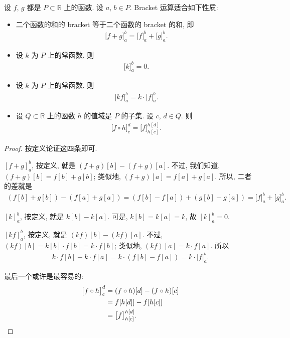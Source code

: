 \begin{theorem}
    设 $f$, $g$ 都是 $P \subset \mathbb{R}$ 上的函数. 设 $a$, $b \in P$. Bracket 运算适合如下性质:
    \begin{itemize}
        \item 二个函数的和的 bracket 等于二个函数的 bracket 的和, 即
              \begin{align*}
                  \big[ f + g \big]_{a}^{b} = \big[ f \big]_{a}^{b} + \big[ g \big]_{a}^{b}.
              \end{align*}
        \item 设 $k$ 为 $P$ 上的常函数. 则
              \begin{align*}
                  \big[ k \big]_{a}^{b} = 0.
              \end{align*}
        \item 设 $k$ 为 $P$ 上的常函数. 则
              \begin{align*}
                  \big[ kf \big]_{a}^{b} = k \cdot \big[ f \big]_{a}^{b}.
              \end{align*}
        \item 设 $Q \subset \mathbb{R}$ 上的函数 $h$ 的值域是 $P$ 的子集. 设 $c$, $d \in Q$. 则
              \begin{align*}
                  \big[ f \circ h \big]_{c}^{d} = \big[ f \big]_{h[c]}^{h[d]}.
              \end{align*}
    \end{itemize}
\end{theorem}

\begin{proof}
    按定义论证这四条即可.

    $[ f + g ]_{a}^{b}$, 按定义, 就是 $(f + g)[b] - (f + g)[a]$. 不过, 我们知道, $(f + g)[b] = f[b] + g[b]$; 类似地, $(f + g)[a] = f[a] + g[a]$. 所以, 二者的差就是
    \begin{align*}
        (f[b] + g[b]) - (f[a] + g[a])
        = (f[b] - f[a]) + (g[b] - g[a])
        = \big[ f \big]_{a}^{b} + \big[ g \big]_{a}^{b}.
    \end{align*}

    $[ k ]_{a}^{b}$, 按定义, 就是 $k[b] - k[a]$. 可是, $k[b] = k[a] = k$, 故 $[ k ]_{a}^{b} = 0$.

    $[ kf ]_{a}^{b}$, 按定义, 就是 $(kf)[b] - (kf)[a]$. 不过, $(kf)[b] = k[b] \cdot f[b] = k \cdot f[b]$; 类似地, $(kf)[a] = k \cdot f[a]$. 所以
    \begin{align*}
        k \cdot f[b] - k \cdot f[a] = k \cdot (f[b] - f[a]) = k \cdot \big[ f \big]_{a}^{b}.
    \end{align*}

    最后一个或许是最容易的:
    \begin{align*}
        \big[ f \circ h \big]_{c}^{d}
        = {} & (f \circ h)[d] - (f \circ h)[c]       \\
        = {} & f[h[d]] - f[h[c]]                     \\
        = {} & \big[ f \big]_{h[c]}^{h[d]}. \qedhere
    \end{align*}
\end{proof}

